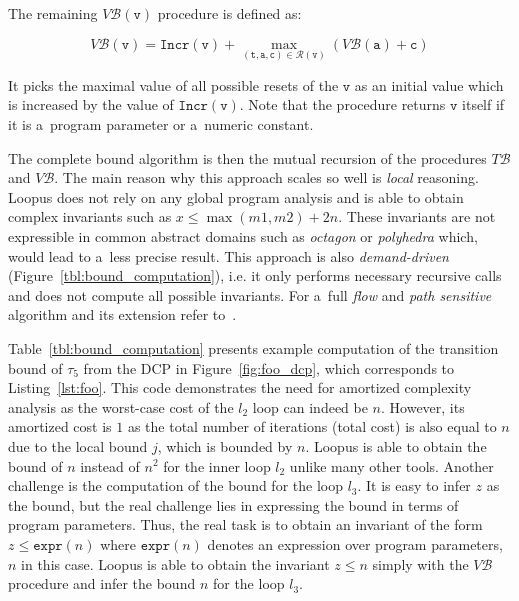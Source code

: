 \documentclass{ExcelAtFIT}
\begin{document}
The remaining $V\mathcal{B}(\mathtt{v})$ procedure
is defined as:
\begin{linenomath}
\begin{equation*}
V\mathcal{B}(\mathtt{v}) =
\mathtt{Incr}(\mathtt{v}) +
\max\limits_{(\mathtt{t, a, c})\in
\mathcal{R}(\mathtt{v})}(
V\mathcal{B}(\mathtt{a}) + \mathtt{c})
\end{equation*}
\end{linenomath}
It picks the maximal value of all possible resets of
the $\mathtt{v}$ as an initial value which is
increased by the value of
$\mathtt{Incr(v)}$. Note that the procedure returns
$\mathtt{v}$ itself if it is a~program parameter or
a~numeric constant.

The complete bound algorithm is then
the mutual recursion of the procedures $T\mathcal{B}$ and
$V\mathcal{B}$. The main reason why this approach scales
so well is \textit{local} reasoning. Loopus does not
rely on any global program analysis and is able to
obtain complex invariants such as
$x \leq \max(m1,m2) + 2n$.
These invariants are not expressible in common abstract
domains such as \textit{octagon} or \textit{polyhedra}
which, would lead to a~less precise result. This approach
is also \textit{demand-driven} (Figure~\ref{tbl:bound_computation}),
i.e. it only performs necessary recursive calls and does not
compute all possible invariants.
For a~full \textit{flow} and \textit{path sensitive}
algorithm and its extension refer
to~\cite{loopus-tool}.

Table~\ref{tbl:bound_computation} presents
example computation of the transition bound of
$\tau_5$ from the DCP in Figure~\ref{fig:foo_dcp},
which corresponds to Listing~\ref{lst:foo}. This code
demonstrates
the need for amortized complexity analysis as the
worst-case cost of the $l_2$ loop can indeed be
$n$. However, its amortized cost is $1$ as the
total number of iterations (total cost) is also equal
to $n$ due to the local bound $j$, which is bounded by
$n$. Loopus is able to obtain the bound of $n$ instead
of $n^2$ for the inner loop $l_2$ unlike many other tools.
Another challenge is the computation of
the bound for the loop $l_3$. It is easy to infer $z$
as the bound, but the real challenge lies in expressing
the bound in terms of program parameters. Thus, the
real task is to obtain an invariant of the form
$z \leq \mathtt{expr}(n)$ where $\mathtt{expr}(n)$
denotes an expression over program parameters,
$n$ in this case. Loopus is able to obtain the
invariant $z \leq n$ simply with the $V\mathcal{B}$
procedure and infer the bound $n$ for
the loop $l_3$.
\end{document}
